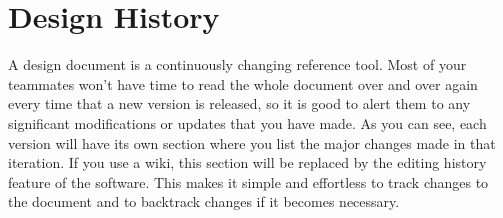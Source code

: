 \chapter{Design History}\label{chap:design-history}
A design document is a continuously changing reference tool. Most of your
teammates won't have time to read the whole document over and over again every
time that a new version is released, so it is good to alert them to any
significant modifications or updates that you have made. As you can see, each
version will have its own section where you list the major changes made in that
iteration. If you use a wiki, this section will be replaced by the editing
history feature of the software. This makes it simple and effortless to track
changes to the document and to backtrack changes if it becomes necessary.



